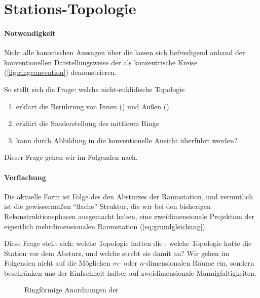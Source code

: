 \section{Stations-Topologie}%
\label{sec:topologie}

\paragraph{Notwendigkeit}

Nicht alle kanonischen Aussagen über die  lassen sich befriedigend anhand der konventionellen Darstellungsweise der  als konzentrische Kreise (\cref{fig:ringconvention}) demonstrieren. 

So stellt sich die Frage: welche nicht-euklidische Topologie
\begin{enumerate}
    \item erklärt die Berührung von Innen () und Außen ()
    \item erklärt die Sonderstellung des mittleren Rings 
    \item kann durch Abbildung in die konventionelle Ansicht überführt werden?
\end{enumerate}
Dieser Frage gehen wir im Folgenden nach. 

\paragraph{Verflachung}
Die aktuelle Form ist Folge des den Absturzes der Raumstation, und vermutlich ist die gewissermaßen "`flache"' Struktur, die wir bei den bisherigen Rekonstruktionsphasen ausgemacht haben, eine zweidimensionale Projektion der eigentlich mehrdimensionalen Raumstation (\cref{eq:grundgleichung}). 

Diese Frage stellt sich: welche Topologie hatten die , welche Topologie hatte die Station vor dem Absturz, und welche strebt sie damit an? Wir gehen im Folgenden nicht auf die Möglichen $m$- oder $n$-dimensionalen Räume ein, sondern beschränken uns der Einfachheit halber auf zweidimensionale Mannigfaltigkeiten.

\begin{figure}[ht!]
    \centering
    \begin{subfigure}{0.4\textwidth}
        \centering
        \resizebox{\textwidth}{!}{
            
        }
    \end{subfigure}
    \hspace{2ex}
    \begin{subfigure}{0.4\textwidth}
        \centering
       \resizebox{\textwidth}{!}{
        
        }
    \end{subfigure}
    
    \caption{Ringförmige Anordnungen der }
    \label{fig:ringring}
\end{figure}

